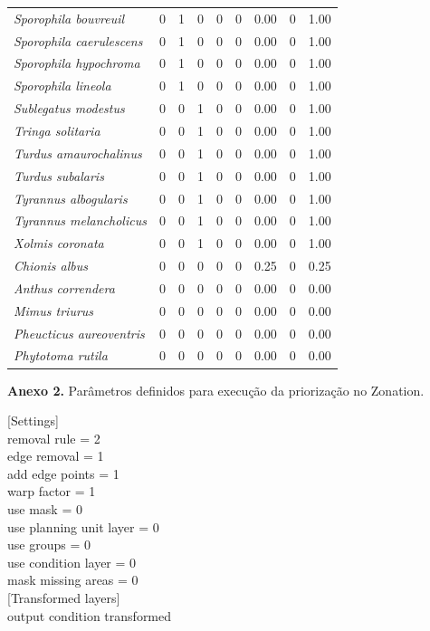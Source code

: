 \documentclass[
  oneside]{scrbook}
\begin{document}
\begin{longtable}{>{}lrrrrrrrr}
\addlinespace
\em{Sporophila bouvreuil} & 0 & 1 & 0 & 0 & 0 & 0.00 & 0 & 1.00\\
\em{Sporophila caerulescens} & 0 & 1 & 0 & 0 & 0 & 0.00 & 0 & 1.00\\
\em{Sporophila hypochroma} & 0 & 1 & 0 & 0 & 0 & 0.00 & 0 & 1.00\\
\em{Sporophila lineola} & 0 & 1 & 0 & 0 & 0 & 0.00 & 0 & 1.00\\
\em{Sublegatus modestus} & 0 & 0 & 1 & 0 & 0 & 0.00 & 0 & 1.00\\
\addlinespace
\em{Tringa solitaria} & 0 & 0 & 1 & 0 & 0 & 0.00 & 0 & 1.00\\
\em{Turdus amaurochalinus} & 0 & 0 & 1 & 0 & 0 & 0.00 & 0 & 1.00\\
\em{Turdus subalaris} & 0 & 0 & 1 & 0 & 0 & 0.00 & 0 & 1.00\\
\em{Tyrannus albogularis} & 0 & 0 & 1 & 0 & 0 & 0.00 & 0 & 1.00\\
\em{Tyrannus melancholicus} & 0 & 0 & 1 & 0 & 0 & 0.00 & 0 & 1.00\\
\addlinespace
\em{Xolmis coronata} & 0 & 0 & 1 & 0 & 0 & 0.00 & 0 & 1.00\\
\em{Chionis albus} & 0 & 0 & 0 & 0 & 0 & 0.25 & 0 & 0.25\\
\em{Anthus correndera} & 0 & 0 & 0 & 0 & 0 & 0.00 & 0 & 0.00\\
\em{Mimus triurus} & 0 & 0 & 0 & 0 & 0 & 0.00 & 0 & 0.00\\
\em{Pheucticus aureoventris} & 0 & 0 & 0 & 0 & 0 & 0.00 & 0 & 0.00\\
\addlinespace
\em{Phytotoma rutila} & 0 & 0 & 0 & 0 & 0 & 0.00 & 0 & 0.00\\
\bottomrule
\end{longtable}

\textbf{Anexo 2.} Parâmetros definidos para execução da priorização no Zonation.

{[}Settings{]}\\
removal rule = 2\\
edge removal = 1\\
add edge points = 1\\
warp factor = 1\\
use mask = 0\\
use planning unit layer = 0\\
use groups = 0\\
use condition layer = 0\\
mask missing areas = 0\\
{[}Transformed layers{]}\\
output condition transformed

  
\end{document}
